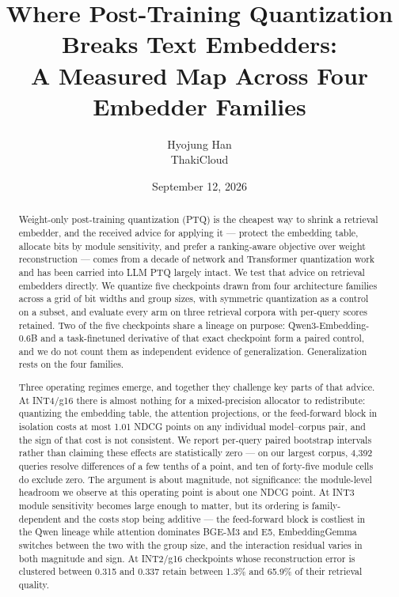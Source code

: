 \documentclass[11pt]{article}
\date{September 12, 2026}
\title{Where Post-Training Quantization Breaks Text Embedders:\\
A Measured Map Across Four Embedder Families}
\author{Hyojung Han\\ThakiCloud}
\begin{document}
\maketitle

\begin{abstract}
Weight-only post-training quantization (PTQ) is the cheapest way to shrink a retrieval
embedder, and the received advice for applying it --- protect the embedding table, allocate
bits by module sensitivity, and prefer a ranking-aware objective over weight reconstruction
--- comes from a decade of network and Transformer quantization work and has been carried
into LLM PTQ largely intact. We test that advice on retrieval embedders directly. We quantize five checkpoints drawn from four
architecture families across a grid of bit widths and group sizes, with symmetric
quantization as a control on a subset, and evaluate every arm on three retrieval corpora with per-query scores retained.
Two of the five checkpoints share a lineage on purpose: Qwen3-Embedding-0.6B and a
task-finetuned derivative of that exact checkpoint form a paired control, and we do not
count them as independent evidence of generalization. Generalization rests on the four
families.

Three operating regimes emerge, and together they challenge key parts of that advice. At INT4/g16
there is almost nothing for a mixed-precision allocator to redistribute: quantizing the
embedding table, the attention projections, or the feed-forward block in isolation costs at
most 1.01 NDCG points on any individual model--corpus pair, and the sign of that cost is not
consistent. We report per-query paired bootstrap intervals rather than claiming these effects
are statistically zero --- on our largest corpus, 4{,}392 queries resolve differences of a few
tenths of a point, and ten of forty-five module cells do exclude zero. The argument is about
magnitude, not significance: the module-level headroom we observe at this operating point is
about one NDCG point. At INT3 module sensitivity becomes large enough to matter, but its
ordering is family-dependent and the costs stop being additive --- the feed-forward block is
costliest in the Qwen lineage while attention dominates BGE-M3 and E5, EmbeddingGemma switches
between the two with the group size, and the interaction residual varies in both magnitude and sign. At INT2/g16 checkpoints whose
reconstruction error is clustered between 0.315 and 0.337 retain between 1.3\% and 65.9\% of
their retrieval quality.


\end{abstract}
\end{document}
